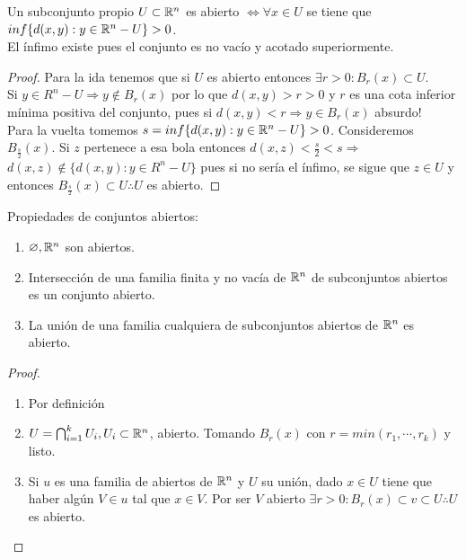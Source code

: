 \begin{prop}
  Un subconjunto propio $U \subset \mathbb{R}^n$ es abierto $\iff \forall x \in U$ se tiene que $inf\{d(x, y) : y \in \mathbb{R}^n - U\} > 0$. \\
  El ínfimo existe pues el conjunto es no vacío y acotado superiormente.
  \begin{proof}
    Para la ida tenemos que si $U$ es abierto entonces $\exists r > 0 : B_r(x) \subset U$. \\
    Si $y \in R^n - U \Rightarrow y \notin B_r(x)$ por lo que $d(x, y) > r > 0$ y $r$ es una cota inferior mínima positiva del conjunto, pues si $d(x,y) < r \Rightarrow y \in B_r(x)$ absurdo! \\

    Para la vuelta tomemos $s = inf\{ d(x,y) : y \in \mathbb{R}^n - U \} > 0$. Consideremos $B_{\frac{s}{2}}(x)$. Si $z$ pertenece a esa bola entonces $d(x, z) < \frac{s}{2} < s \Rightarrow$ \\
    $d(x, z) \notin \{ d(x,y) : y \in R^n - U \}$ pues si no sería el ínfimo, se sigue que $z \in U$ y entonces $B_{\frac{s}{2}}(x) \subset U \therefore U$ es abierto. 
  \end{proof}
\end{prop}

\begin{prop}
  Propiedades de conjuntos abiertos:
  \begin{enumerate}
    \item $\varnothing, \mathbb{R}^n$ son abiertos.
    \item Intersección de una familia finita y no vacía de $\mathbb{R}^n$ de subconjuntos abiertos es un conjunto abierto.
    \item La unión de una familia cualquiera de subconjuntos abiertos de $\mathbb{R}^n$ es abierto.
  \end{enumerate}
  \begin{proof}
    \begin{enumerate}
      \item Por definición
      \item $U = \bigcap_{i = 1}^k U_i, U_i \subset \mathbb{R}^n$, abierto. Tomando $B_r(x)$ con $r = min(r_1, \cdots, r_k)$ y listo.
      \item Si $u$ es una familia de abiertos de $\mathbb{R}^n$ y $U$ su unión, dado $x \in U$ tiene que haber algún $V \in u$ tal que $x \in V$. Por ser $V$ abierto $\exists r > 0 : B_r(x) \subset v \subset U \therefore U$ es abierto.
    \end{enumerate}
  \end{proof}
\end{prop}

